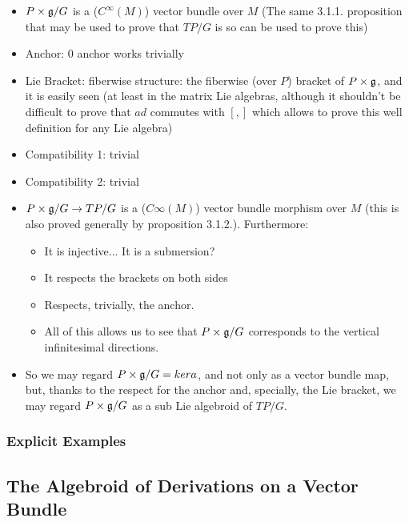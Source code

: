     \begin{itemize}
    \item $P \times \mathfrak{g}/G$ is a ($C^\infty(M)$) vector bundle over $M$ (The same 3.1.1. proposition that may be used to prove that $TP/G$ is so can be used to prove this)
    
    \item Anchor: $0$ anchor works trivially
    
    \item Lie Bracket: fiberwise structure: the fiberwise (over $P$) bracket of $P \times \mathfrak{g}$, and it is easily seen (at least in the matrix Lie algebras, although it shouldn't be difficult to prove that $ad$ commutes with $[,]$ which allows to prove this well definition for any Lie algebra)
    
    \item Compatibility 1: trivial
    
    \item Compatibility 2: trivial
    
    \item $P \times \mathfrak{g}/ G \to TP / G$ is a ($C\infty(M)$) vector bundle morphism over $M$ (this is also proved generally by proposition 3.1.2.). Furthermore:
        \begin{itemize}
        \item It is injective... It is a submersion?
        \item It respects the brackets on both sides
        \item Respects, trivially, the anchor.
        \item All of this allows us to see that $P \times \mathfrak{g}/G$ corresponds to the vertical infinitesimal directions.
        \end{itemize}
    
    \item So we may regard $P \times \mathfrak{g} / G = ker a$, and not only as a vector bundle map, but, thanks to the respect for the anchor and, specially, the Lie bracket, we may regard $P \times \mathfrak{g}/G$ as a sub Lie algebroid of $TP/G$.
    \end{itemize}

\subsubsection{Explicit Examples}

\subsection{The Algebroid of Derivations on a Vector Bundle}

